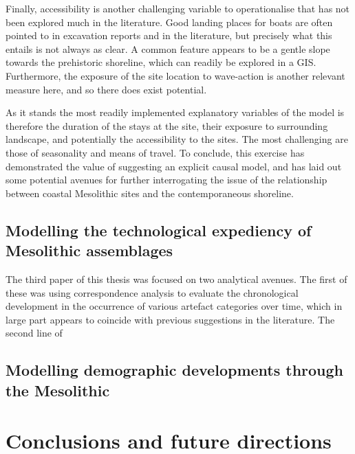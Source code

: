 \documentclass[
  12pt,
  a4paper,
  oneside]{book}
\begin{document}
Finally, accessibility is another challenging variable to operationalise that has not been explored much in the literature. Good landing places for boats are often pointed to in excavation reports and in the literature, but precisely what this entails is not always as clear. A common feature appears to be a gentle slope towards the prehistoric shoreline, which can readily be explored in a GIS. Furthermore, the exposure of the site location to wave-action is another relevant measure here, and so there does exist potential.

As it stands the most readily implemented explanatory variables of the model is therefore the duration of the stays at the site, their exposure to surrounding landscape, and potentially the accessibility to the sites. The most challenging are those of seasonality and means of travel. To conclude, this exercise has demonstrated the value of suggesting an explicit causal model, and has laid out some potential avenues for further interrogating the issue of the relationship between coastal Mesolithic sites and the contemporaneous shoreline.

\hypertarget{modelling-the-technological-expediency-of-mesolithic-assemblages}{%
\section{Modelling the technological expediency of Mesolithic assemblages}\label{modelling-the-technological-expediency-of-mesolithic-assemblages}}


The third paper of this thesis was focused on two analytical avenues. The first of these was using correspondence analysis to evaluate the chronological development in the occurrence of various artefact categories over time, which in large part appears to coincide with previous suggestions in the literature. The second line of

\hypertarget{modelling-demographic-developments-through-the-mesolithic}{%
\section{Modelling demographic developments through the Mesolithic}\label{modelling-demographic-developments-through-the-mesolithic}}


\hypertarget{conclusions-and-future-directions}{%
\chapter{Conclusions and future directions}\label{conclusions-and-future-directions}}
\end{document}
